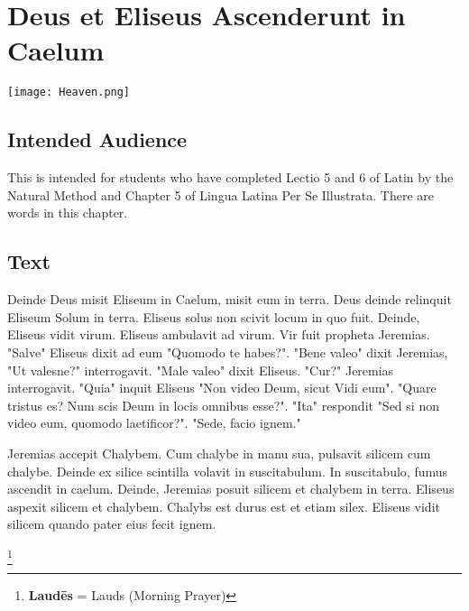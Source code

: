 \chapter{Deus et Eliseus Ascenderunt in Caelum}
\begin{center}
\texttt{[image: Heaven.png]}
\end{center}

\section{Intended Audience}
This is intended for students who have completed Lectio 5 and 6 of Latin by the Natural Method and Chapter 5 of Lingua Latina Per Se Illustrata. There are words in this chapter.

\section{Text}
Deinde Deus misit Eliseum in Caelum, misit eum in terra. Deus deinde relinquit Eliseum Solum in terra. Eliseus solus non scivit locum in quo fuit. Deinde, Eliseus vidit virum. Eliseus ambulavit ad virum. Vir fuit propheta Jeremias. "Salve" Eliseus dixit ad eum "Quomodo te habes?". "Bene valeo" dixit Jeremias, "Ut valesne?" interrogavit. "Male valeo" dixit Eliseus. "Cur?" Jeremias interrogavit. "Quia" inquit Eliseus "Non video Deum, sicut Vidi eum". "Quare tristus es? Num scis Deum in locis omnibus esse?". "Ita" respondit "Sed si non video eum, quomodo laetificor?". "Sede, facio ignem." \par 

Jeremias accepit Chalybem. Cum chalybe in manu sua, pulsavit silicem cum chalybe. Deinde ex silice scintilla volavit in suscitabulum. In suscitabulo, fumus ascendit in caelum. Deinde, Jeremias posuit silicem et chalybem in terra. Eliseus aspexit silicem et chalybem. Chalybs est durus est et etiam silex. Eliseus vidit silicem quando pater eius fecit ignem. 

\footnote{\textbf{Laudēs} = Lauds (Morning Prayer)}


